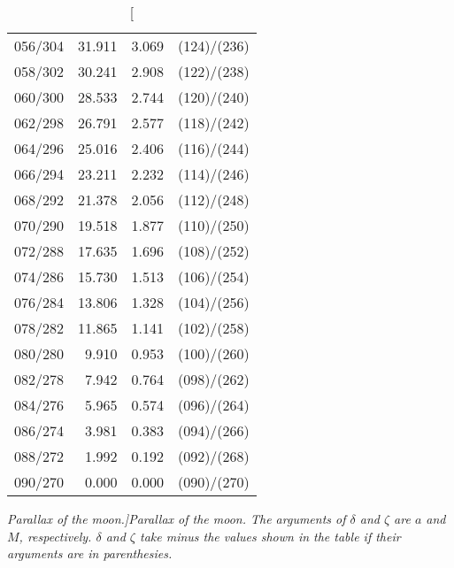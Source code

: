 \begin{table}
{\begin{tabular}{rrrc}
056/304 & 31.911 &  3.069 & (124)/(236)\\
058/302 & 30.241 &  2.908 & (122)/(238)\\
060/300 & 28.533 &  2.744 & (120)/(240)\\
062/298 & 26.791 &  2.577 & (118)/(242)\\
064/296 & 25.016 &  2.406 & (116)/(244)\\
066/294 & 23.211 &  2.232 & (114)/(246)\\
068/292 & 21.378 &  2.056 & (112)/(248)\\
070/290 & 19.518 &  1.877 & (110)/(250)\\
072/288 & 17.635 &  1.696 & (108)/(252)\\
074/286 & 15.730 &  1.513 & (106)/(254)\\
076/284 & 13.806 &  1.328 & (104)/(256)\\
078/282 & 11.865 &  1.141 & (102)/(258)\\
080/280 &  9.910 &  0.953 & (100)/(260)\\
082/278 &  7.942 &  0.764 & (098)/(262)\\
084/276 &  5.965 &  0.574 & (096)/(264)\\
086/274 &  3.981 &  0.383 & (094)/(266)\\
088/272 &  1.992 &  0.192 & (092)/(268)\\
090/270 &  0.000 &  0.000 & (090)/(270)\\
\end{tabular}}
\caption[\em Parallax of the moon.]{\em Parallax of the moon. The  arguments of $\delta$ and $\zeta$ are $a$
and $M$, respectively.  $\delta$ and $\zeta$ take minus the values shown
in the table if their arguments are
in parenthesies. }\label{tmoonc}
\end{table}

